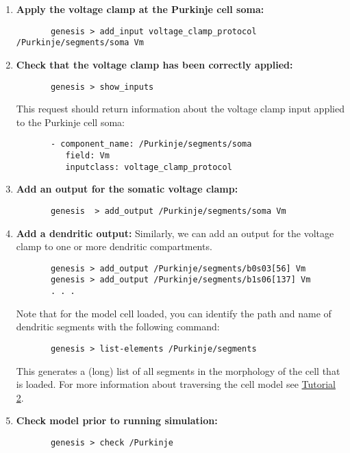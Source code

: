 \documentclass[12pt]{article}
\begin{document}
\begin{enumerate}
	\item{\bf Apply the voltage clamp at the Purkinje cell soma:}
	\begin{verbatim}
	   genesis > add_input voltage_clamp_protocol /Purkinje/segments/soma Vm
	\end{verbatim}
	
	\item{\bf Check that the voltage clamp has been correctly applied:}
	\begin{verbatim}
	   genesis > show_inputs
	\end{verbatim}
	This request should return information about the voltage clamp input applied to the Purkinje cell soma:
	\begin{verbatim}
	   - component_name: /Purkinje/segments/soma
	      field: Vm
	      inputclass: voltage_clamp_protocol
	   \end{verbatim}
	
	\item{\bf Add an output for the somatic voltage clamp:}
	\begin{verbatim}
	   genesis  > add_output /Purkinje/segments/soma Vm
	\end{verbatim}
	
	\item{\bf Add a dendritic output:} Similarly, we can add an output for the voltage clamp to one or more dendritic compartments.
	\begin{verbatim}
	   genesis > add_output /Purkinje/segments/b0s03[56] Vm
	   genesis > add_output /Purkinje/segments/b1s06[137] Vm
	   . . .
	\end{verbatim}
	Note that for the model cell loaded, you can identify the path and name of dendritic segments with the following command:
	\begin{verbatim}
	   genesis > list-elements /Purkinje/segments
	\end{verbatim}	
	This generates a (long) list of all segments in the morphology of the cell that is loaded. For more information about traversing the cell model see \href{../tutorial2/tutorial2.tex}{Tutorial 2}.
	
         \item{\bf Check model prior to running simulation:}
	\begin{verbatim}
	   genesis > check /Purkinje
	\end{verbatim}

\end{enumerate}
\end{document}
